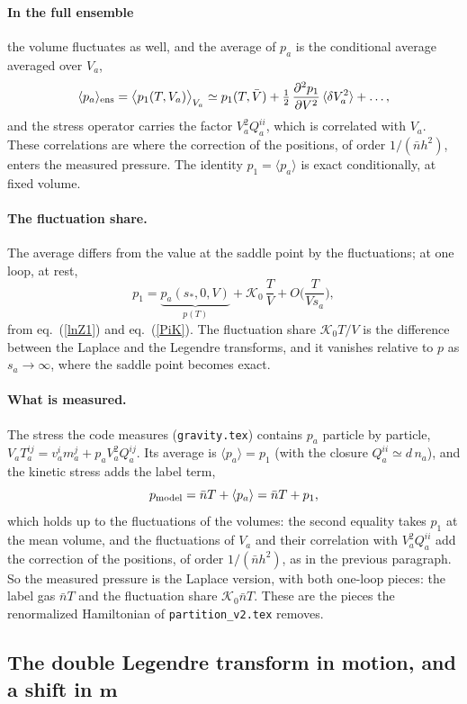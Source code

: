 \documentclass[11pt,aps,preprint,nofootinbib,superscriptaddress,tightenlines]{revtex4-2}
\newcommand{\avg}[1]{\langle #1\rangle}
\def\st{\begin{equation}}
\def\stp{\end{equation}}
\def\Eq#1{eq.~(\ref{#1})}
\let\oldparagraph\paragraph
\renewcommand{\paragraph}{\par\bigskip\oldparagraph}
\begin{document}
\paragraph{In the full ensemble} the volume fluctuates as well, and the average of $p_a$ is the conditional average averaged over $V_a$,
\st
\avg{p_a}_{\rm ens}=\big\langle p_1(T,V_a)\big\rangle_{V_a}\simeq p_1(T,\bar V)+\tfrac12\,\frac{\partial^2p_1}{\partial V^2}\,\avg{\delta V_a^2}+\dots ,
\stp
and the stress operator carries the factor $V_a^2Q_a^{ii}$, which is correlated with $V_a$.  These correlations are where the correction of the positions, of order
$1/(\bar nh^2)$, enters the measured pressure.  The identity $p_1=\avg{p_a}$ is exact conditionally, at fixed volume.

\paragraph{The fluctuation share.}  The average differs from the value at the saddle point by the fluctuations; at one loop, at rest,
\st
p_1=\underbrace{p_a(s_*,0,V)}_{p(T)}+\mathcal K_0\,\frac TV+O\Big(\frac T{V s_a}\Big),
\stp
from \Eq{lnZ1} and \Eq{PiK}.  The fluctuation share $\mathcal K_0T/V$ is the difference between the Laplace and the Legendre transforms, and it vanishes relative to
$p$ as $s_a\to\infty$, where the saddle point becomes exact.

\paragraph{What is measured.}  The stress the code measures (\texttt{gravity.tex}) contains $p_a$ particle by particle, $V_aT_a^{ij}=v_a^im_a^j+p_aV_a^2Q_a^{ij}$.  Its
average is $\avg{p_a}=p_1$ (with the closure $Q_a^{ii}\simeq d\,n_a$), and the kinetic stress adds the label term,
\st
p_{\rm model}=\bar nT+\avg{p_a}=\bar nT+p_1 ,
\stp
which holds up to the fluctuations of the volumes: the second equality takes $p_1$ at the mean volume, and the fluctuations of $V_a$ and their correlation with
$V_a^2Q_a^{ii}$ add the correction of the positions, of order $1/(\bar nh^2)$, as in the previous paragraph.  So the measured pressure is the Laplace version, with both one-loop pieces: the label gas $\bar nT$ and the fluctuation share $\mathcal K_0\bar nT$.  These are the pieces
the renormalized Hamiltonian of \nolinkurl{partition_v2.tex} removes.

\subsection{The double Legendre transform in motion, and a shift in \texorpdfstring{$\bm m$}{m}}
\label{app:doublelegendre}
\end{document}
